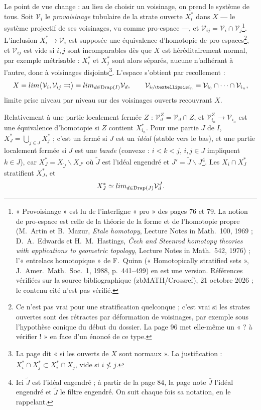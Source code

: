 \documentclass[11pt,a4paper]{article}
\begin{document}
Le point de vue change : au lieu de choisir un voisinage, on prend le système de
tous. Soit $\mathcal{V}_i$ le \emph{provoisinage} tubulaire de la strate ouverte
$X^{*}_i$ dans $X$ — le système projectif de ses voisinages, vu comme pro-espace —,
et $\mathcal{V}_{ij} = \mathcal{V}_i \cap \mathcal{V}_j$\footnote{« Provoisinage »
est lu de l'interligne « pro » des pages 76 et 79. La notion de pro-espace est
celle de la théorie de la forme et de l'homotopie propre (M.~Artin et B.~Mazur, \emph{Etale homotopy}, Lecture Notes in Math.\ 100, 1969 ; D.~A.~Edwards et H.~M.~Hastings, \emph{Čech and Steenrod homotopy theories with applications to geometric topology}, Lecture Notes in Math.\ 542, 1976) ; l'« entrelacs homotopique » de F.~Quinn (« Homotopically stratified sets », J.~Amer.\ Math.\ Soc.\ 1, 1988, p.~441--499) en est une version. Références vérifiées sur la source bibliographique (zbMATH/Crossref), 21 octobre 2026 ; le contenu cité n'est pas vérifié.}. L'inclusion $X^{*}_i \to \mathcal{V}_i$ est supposée une équivalence
d'homotopie de pro-espaces\footnote{Ce n'est pas vrai pour une stratification
quelconque ; c'est vrai si les strates ouvertes sont des rétractes par déformation
de voisinages, par exemple sous l'hypothèse conique du début du dossier. La page
96 met elle-même un « ? à vérifier ! » en face d'un énoncé de ce type.}, et
$\mathcal{V}_{ij}$ est vide si $i, j$ sont incomparables dès que $X$ est
héréditairement normal, par exemple métrisable : $X^{*}_i$ et $X^{*}_j$ sont alors
séparés, aucune n'adhérant à l'autre, donc à voisinages disjoints\footnote{La page
dit « si les ouverts de $X$ sont normaux ». La justification : $X^{*}_i \cap
\overline{X^{*}_j} \subset X^{*}_i \cap X_j$, vide si $i \not\leq j$.}. L'espace
s'obtient par recollement :
\[
X = \varinjlim \bigl(\mathcal{V}_i, \mathcal{V}_{ij} \rightrightarrows\bigr) =
\varinjlim_{d \in \mathrm{Drap}(I)} \mathcal{V}_d, \qquad \mathcal{V}_{i_0 … i_n}
= \mathcal{V}_{i_0} \cap \cdots \cap \mathcal{V}_{i_n},
\]
limite prise niveau par niveau sur des voisinages ouverts recouvrant $X$.

Relativement à une partie localement fermée $Z$ : $\mathcal{V}^Z_d = \mathcal{V}_d
\cap Z$, et $\mathcal{V}^Z_{i_n} \to \mathcal{V}_{i_n}$ est une équivalence d'homotopie
si $Z$ contient $X^{*}_{i_n}$. Pour une partie $J$ de $I$, $X^{*}_J = \bigcup_{j \in J}
X^{*}_j$ ; c'est un fermé si $J$ est un \emph{idéal} (stable vers le bas), et une
partie localement fermée si $J$ est une \emph{bande} (convexe : $i<k<j$, $i,j \in J$
impliquent $k \in J$), car $X^{*}_J = X_{\tilde J} \smallsetminus X_{J'}$ où $\tilde J$
est l'idéal engendré et $J' = \tilde J \smallsetminus J$\footnote{Ici $\tilde J$ est
l'idéal engendré ; à partir de la page 84, la page note $\bar J$ l'idéal engendré
et $\tilde J$ le filtre engendré. On suit chaque fois sa notation, en le
rappelant.}. Les $X_i \cap X^{*}_J$ stratifient $X^{*}_J$, et
\[
X^{*}_J \simeq \varinjlim_{d \in \mathrm{Drap}(J)} \mathcal{V}^{J}_d .
\]
\end{document}
